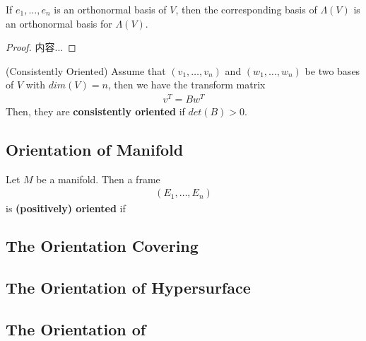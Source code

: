\documentclass[Total.tex]{subfiles}
\begin{document}
				\begin{proposition}
					If $e_1,\dots,e_n$ is an orthonormal basis of $V$, then the corresponding basis of $\Lambda(V)$ is an orthonormal basis for $\Lambda(V)$.
				\end{proposition}
				\begin{proof}
					内容...
				\end{proof}
				
				
				\begin{Def}
					(Consistently Oriented) Assume that $(v_1,\dots,v_n)$ and $(w_1,\dots,w_n)$ be two bases of $V$ with $dim(V)=n$, then we have the transform matrix
					\begin{gather*}
						v^T=Bw^T
					\end{gather*}
					Then, they are \textbf{consistently oriented} if $det(B)>0$.
				\end{Def}
			\subsection{Orientation of Manifold}
				\begin{Def}
					Let $M$ be a manifold. Then a frame
					\begin{gather*}
						(E_1,\dots,E_n)
					\end{gather*}
					is \textbf{(positively) oriented} if
				\end{Def}
			\subsection{The Orientation Covering}
			\subsection{The Orientation of Hypersurface}
			\subsection{The Orientation of }
\end{document}
